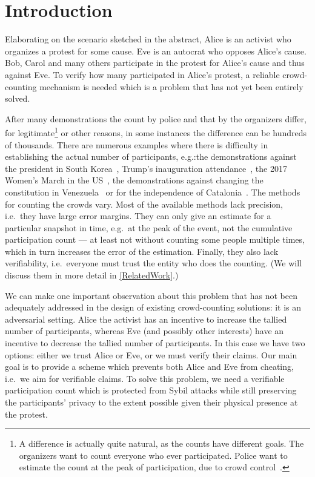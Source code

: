 \section{Introduction}%
\label{Introduction}

Elaborating on the scenario sketched in the abstract, Alice is an
activist who organizes a protest for some cause.
Eve is an autocrat who opposes Alice's cause.
Bob, Carol and many others participate in the protest for Alice's
cause and thus against Eve. To verify how many participated in Alice's
protest, a reliable crowd-counting mechanism is needed which is a 
problem that has not yet been entirely solved.

After many demonstrations the count by police and that by the organizers 
differ, for legitimate\footnote{%
  A difference is actually quite natural, as the counts have different goals.
  The organizers want to count everyone who ever participated.
  Police want to estimate the count at the peak of participation, due to crowd 
  control~\cite{2016DemonstrationsInSeoul}.
} or other reasons, in some instances the difference can be hundreds of thousands.
There are numerous examples where there is difficulty in establishing the actual 
number of participants, e.g.:\@ the demonstrations against the president in 
South Korea~\cite{2016DemonstrationsInSeoul}, Trump's inauguration 
attendance~\cite{HowWillWeKnowTrumpInauguralCrowdSize}, the 2017 Women's March 
in the US~\cite{2017WomensMarchesInUS}, the demonstrations against changing the 
constitution in Venezuela~\cite{AlJazeeraOnVenezuela2017} or for the 
independence of Catalonia~\cite{CataloniaDemonstrations}.
The methods for counting the crowds vary.
Most of the available methods lack precision, i.e.\ they have large error 
margins.
They can only give an estimate for a particular snapshot in time, e.g.\ at the 
peak of the event, not the cumulative participation count --- at least not 
without counting some people multiple times, which in turn increases the error 
of the estimation.
Finally, they also lack verifiability, i.e.\ everyone must trust the entity who
does the counting.
(We will discuss them in more detail in \cref{RelatedWork}.)

We can make one important observation about this problem that has not
been adequately addressed in the design of existing crowd-counting solutions: it is an adversarial setting.
Alice the activist has an incentive to increase the tallied number of 
participants, whereas Eve (and possibly other interests) have an incentive to 
decrease the tallied number of participants.
In this case we have two options:
either we trust Alice or Eve, or we must verify their claims.
Our main goal is to provide a scheme which prevents both Alice and Eve from 
cheating, i.e.\ we aim for verifiable claims.
To solve this problem, we need a verifiable participation count which is 
protected from Sybil attacks while still preserving the participants'
privacy to the extent possible given their physical presence at the protest.

